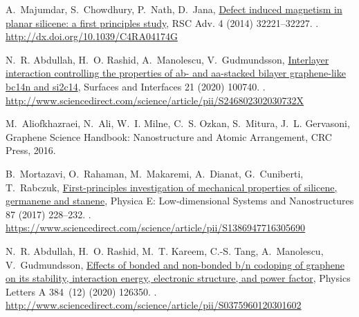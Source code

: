 \documentclass[5p,twocolumn]{elsarticle}
\begin{document}
\begin{thebibliography}{10}
		A.~Majumdar, S.~Chowdhury, P.~Nath, D.~Jana,
		\href{http://dx.doi.org/10.1039/C4RA04174G}{Defect induced magnetism in
			planar silicene: a first principles study}, RSC Adv. 4 (2014) 32221--32227.
		\newblock \href {https://doi.org/10.1039/C4RA04174G}
		{}.
		\newline\urlprefix\url{http://dx.doi.org/10.1039/C4RA04174G}
		
		N.~R. Abdullah, H.~O. Rashid, A.~Manolescu, V.~Gudmundsson,
		\href{http://www.sciencedirect.com/science/article/pii/S246802302030732X}{Interlayer
			interaction controlling the properties of ab- and aa-stacked bilayer
			graphene-like bc14n and si2c14}, Surfaces and Interfaces 21 (2020) 100740.
		\newblock \href {https://doi.org/https://doi.org/10.1016/j.surfin.2020.100740}
		{}.
		\newline\urlprefix\url{http://www.sciencedirect.com/science/article/pii/S246802302030732X}
		
		M.~Aliofkhazraei, N.~Ali, W.~I. Milne, C.~S. Ozkan, S.~Mitura, J.~L. Gervasoni,
		Graphene Science Handbook: Nanostructure and Atomic Arrangement, CRC Press,
		2016.
		
		B.~Mortazavi, O.~Rahaman, M.~Makaremi, A.~Dianat, G.~Cuniberti, T.~Rabczuk,
		\href{https://www.sciencedirect.com/science/article/pii/S1386947716305690}{First-principles
			investigation of mechanical properties of silicene, germanene and stanene},
		Physica E: Low-dimensional Systems and Nanostructures 87 (2017) 228--232.
		\newblock \href {https://doi.org/https://doi.org/10.1016/j.physe.2016.10.047}
		{}.
		\newline\urlprefix\url{https://www.sciencedirect.com/science/article/pii/S1386947716305690}
		
		N.~R. Abdullah, H.~O. Rashid, M.~T. Kareem, C.-S. Tang, A.~Manolescu,
		V.~Gudmundsson,
		\href{http://www.sciencedirect.com/science/article/pii/S0375960120301602}{Effects
			of bonded and non-bonded b/n codoping of graphene on its stability,
			interaction energy, electronic structure, and power factor}, Physics Letters
		A 384~(12) (2020) 126350.
		\newblock \href {https://doi.org/10.1016/j.physleta.2020.126350}
		{}.
		\newline\urlprefix\url{http://www.sciencedirect.com/science/article/pii/S0375960120301602}
		

\end{thebibliography}
\end{document}
